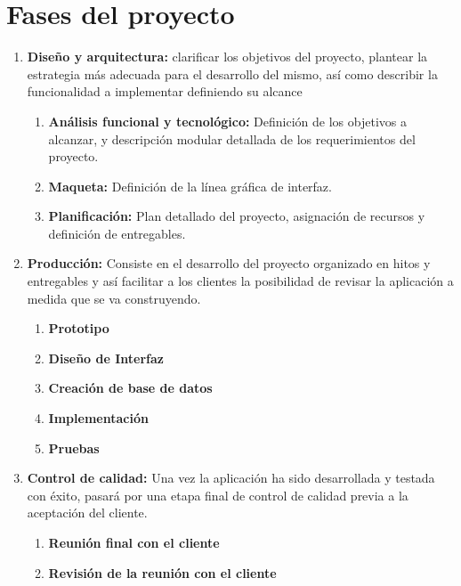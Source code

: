 \documentclass[a4paper,10pt]{scrartcl}
\begin{document}
\newpage

\section{Fases del proyecto}


\begin{enumerate}
	\item \textbf{Diseño y arquitectura:} clarificar los objetivos del proyecto, plantear la estrategia más adecuada para el desarrollo del mismo, así como describir la funcionalidad a implementar definiendo su alcance
	\begin{enumerate}[label*=\arabic*.]
		\item \textbf{Análisis funcional y tecnológico:} Definición de los objetivos a alcanzar, y 	descripción modular detallada de los requerimientos del proyecto.
		\item \textbf{Maqueta:} Definición de la línea gráfica de interfaz.
		\item \textbf{Planificación:} Plan detallado del proyecto, asignación de recursos y definición de entregables.
	\end{enumerate}
	
	\item \textbf{Producción:} Consiste en el desarrollo del proyecto organizado en hitos y entregables y así facilitar a los clientes la posibilidad de revisar la aplicación a medida que se va construyendo.
	\begin{enumerate}[label*=\arabic*.]
		\item \textbf{Prototipo}
		\item \textbf{Diseño de Interfaz} 
		\item \textbf{Creación de base de datos}
		\item \textbf{Implementación} 
		\item \textbf{Pruebas}
	\end{enumerate}
	
	\item \textbf{Control de calidad:} Una vez la aplicación ha sido desarrollada y testada con éxito, pasará por una etapa final de control de calidad previa a la aceptación del cliente.
	\begin{enumerate}[label*=\arabic*.]
		\item \textbf{Reunión final con el cliente}
		\item \textbf{Revisión de la reunión con el cliente}
	\end{enumerate}
	

\end{enumerate}
\end{document}
